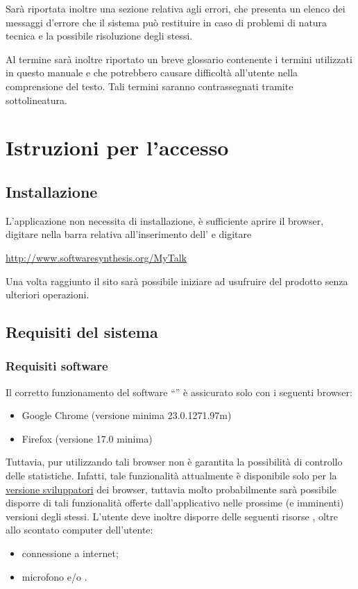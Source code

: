 Sarà riportata inoltre una sezione relativa agli errori, che presenta un elenco dei messaggi d'errore che il sistema può restituire in caso di problemi di natura tecnica e la possibile risoluzione degli stessi. 

Al termine sarà inoltre riportato un breve glossario contenente i termini utilizzati in questo manuale e che potrebbero causare difficoltà all'utente nella comprensione del testo. Tali termini saranno contrassegnati tramite sottolineatura. 

\section{Istruzioni per l'accesso}

\subsection{Installazione}
L'applicazione non necessita di installazione, è sufficiente aprire il browser, digitare nella barra relativa all'inserimento dell'\underline{} e digitare
\begin{center}
 \url{http://www.softwaresynthesis.org/MyTalk}
\end{center}
Una volta raggiunto il sito sarà possibile iniziare ad usufruire del prodotto senza ulteriori operazioni.

\subsection{Requisiti del sistema}
\subsubsection{Requisiti software}
Il corretto funzionamento del software  ``\caName'' è assicurato solo con i seguenti browser:
\begin{itemize}
  \item Google Chrome (versione minima 23.0.1271.97m)
  \item Firefox (versione 17.0 minima)
\end{itemize}

Tuttavia, pur utilizzando tali browser non è garantita la possibilità di controllo delle statistiche. Infatti, tale funzionalità attualmente è disponibile solo per la \underline{versione sviluppatori} dei browser, tuttavia molto probabilmente sarà possibile disporre di tali funzionalità offerte dall'applicativo nelle prossime (e imminenti) versioni degli stessi.
L'utente deve inoltre disporre delle seguenti risorse , oltre allo scontato computer dell'utente:
\begin{itemize}
  \item connessione a internet;
  \item microfono e/o  .
 \end{itemize}

